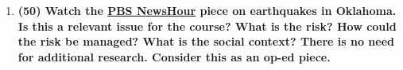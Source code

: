 \documentclass[11pt,a4paper]{article}
\begin{document}
\begin{enumerate}[leftmargin=*,topsep=0pt,font=\bfseries]
        
        
        
        
        
        
        
        
        
        
        
        \newpage
    \item\textbf{(50) Watch the \href{https://youtu.be/csbdeOfhKTM}{PBS NewsHour} piece on earthquakes in Oklahoma. Is this a relevant issue for the course? What is the risk? How could the risk be managed? What is the social context? There is no need for additional research. Consider this as an op-ed piece.}
        \vspace{\baselineskip}

        
        
        
        
        
        
        
        
        
        
        
        
        

        
        
\end{enumerate}

\newpage 


\setlength{\bibhang}{0pt}

\end{document}
